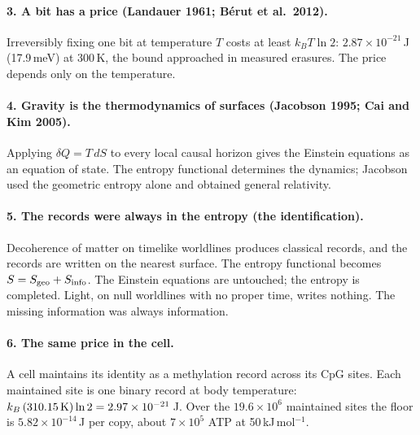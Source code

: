 \paragraph{3. A bit has a price (Landauer 1961; B\'erut et al.\ 2012).} Irreversibly fixing one bit at temperature $T$ costs at least
$k_BT\ln2$: $2.87\times10^{-21}$\,J (17.9\,meV) at 300\,K, the bound approached in measured erasures. The price depends only on the temperature.
\paragraph{4. Gravity is the thermodynamics of surfaces (Jacobson 1995; Cai and Kim 2005).} Applying $\delta Q=T\,dS$ to every local causal
horizon gives the Einstein equations as an equation of state. The entropy functional determines the dynamics; Jacobson used the geometric
entropy alone and obtained general relativity.
\paragraph{5. The records were always in the entropy (the identification).} Decoherence of matter on timelike worldlines produces classical records,
and the records are written on the nearest surface. The entropy functional becomes $S=S_{\rm geo}+S_{\rm info}$. The Einstein equations are
untouched; the entropy is completed. Light, on null worldlines with no proper time, writes nothing. The missing information was always information.
\paragraph{6. The same price in the cell.} A cell maintains its identity as a methylation record across its CpG sites. Each maintained
site is one binary record at body temperature: $k_B\,(310.15\,{\rm K})\ln2=2.97\times10^{-21}$\,J. Over the $19.6\times10^6$ maintained sites the floor is
$5.82\times10^{-14}$\,J per copy, about $7\times10^5$ ATP at 50\,kJ\,mol$^{-1}$.

